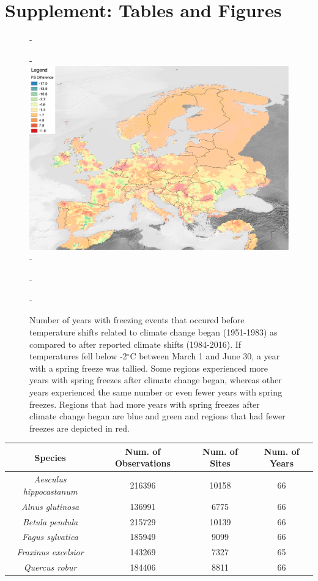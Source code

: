 \documentclass{article}\usepackage[]{graphicx}\usepackage[]{color}
\begin{document}
\section*{Supplement: Tables and Figures}
{\begin{figure} [H]
  -\begin{center}
  -\includegraphics[width=12cm]{..//figures/FS_Diff.pdf}
  -\caption{Number of years with freezing events that occured before temperature shifts related to climate change began (1951-1983) as compared to after reported climate shifts (1984-2016). If temperatures fell below -2$^{\circ}$C between March 1 and June 30, a year with a spring freeze was tallied. Some regions experienced more years with spring freezes after climate change began, whereas other years experienced the same number or even fewer years with spring freezes. Regions that had more years with spring freezes after climate change began are blue and green and regions that had fewer freezes are depicted in red.}\label{fig:region}
  -\end{center}
  -\end{figure}}
  
\begin{center}
 \label{tab:spp} 
\begin{tabular}{c c c c}
\hline
\textbf{Species} & \textbf{Num. of Observations} & \textbf{Num. of Sites} & \textbf{Num. of Years} \\
\hline
\textit{Aesculus hippocastanum} & 216396 & 10158 & 66  \\
\hline
\textit{Alnus glutinosa} & 136991 & 6775 & 66 \\
\hline
\textit{Betula pendula} & 215729 & 10139 & 66 \\
\hline
\textit{Fagus sylvatica} & 185949 & 9099 & 66 \\
\hline
\textit{Fraxinus excelsior} & 143269 & 7327 & 65 \\
\hline
\textit{Quercus robur} & 184406  & 8811 & 66 \\
\end{tabular}
\end{center}
  
\end{document}
